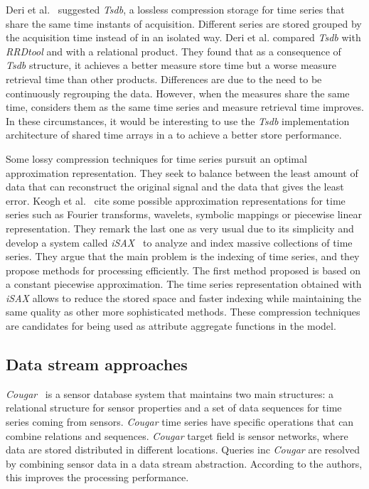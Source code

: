 Deri et al.~\cite{deri12:tsdb_compressed_database} suggested
\emph{Tsdb}, a lossless compression storage  for time
series that share the same time instants of acquisition. Different
series are stored grouped by the acquisition time instead of in an
isolated way.  Deri et al. compared \emph{Tsdb} with \emph{RRDtool}
and with a relational product. They found that as a consequence of
\emph{Tsdb} structure, it achieves a better measure store time but a
worse measure retrieval time than other products. Differences are due
to the need to be continuously regrouping the data.  However, when the
measures share the same time,  considers them as the same
time series and measure retrieval time improves. In these
circumstances, it would be interesting to use the \emph{Tsdb}
implementation architecture of shared time arrays in a  to
achieve a better store performance.

Some lossy compression techniques for time series pursuit an optimal
approximation representation. They seek to balance between the least
amount of data that can reconstruct the original signal and the data
that gives the least error. Keogh et al.~\cite{keogh01} cite some
possible approximation representations for time series such as Fourier
transforms, wavelets, symbolic mappings or piecewise linear
representation. They remark the last one as very usual due to its
simplicity and develop a system called
\emph{iSAX}~\cite{keogh08:isax,keogh10:isax} to analyze and index
massive collections of time series. They argue that the main problem
is the indexing of time series, and they propose methods for
processing efficiently. The first method proposed is based on a
constant piecewise approximation. The time series representation
obtained with \emph{iSAX} allows to reduce the stored space and faster
indexing while maintaining the same quality as other more
sophisticated methods.  These compression techniques are candidates
for being used as attribute aggregate functions in the 
model.


\subsection{Data stream approaches}

\emph{Cougar}~\cite{bonnet01} is a sensor database system that
maintains two main structures: a relational structure for sensor
properties and a set of data sequences for time series coming from
sensors. \emph{Cougar} time series have specific operations that can
combine relations and sequences. \emph{Cougar} target field is sensor
networks, where data are stored distributed in different
locations. Queries inc \emph{Cougar} are resolved by combining sensor
data in a data stream abstraction. According to the authors, this
improves the processing performance.

